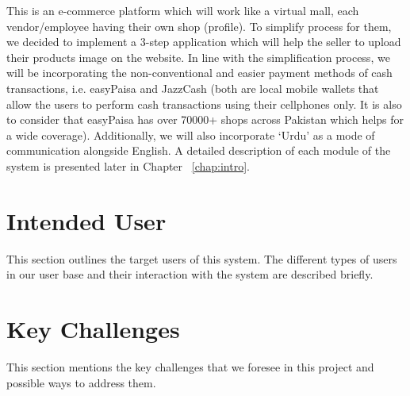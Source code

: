 This is an e-commerce platform which will work like a virtual mall, each vendor/employee having their
own shop (profile). To simplify process for them, we decided to implement a 3-step application which
will help the seller to upload their products image on the website.
In line with the simplification process, we will be incorporating the non-conventional and easier
payment methods of cash transactions, i.e. easyPaisa and JazzCash (both are local mobile wallets that
allow the users to perform cash transactions using their cellphones only. It is also to consider that
easyPaisa has over 70000+ shops across Pakistan which helps for a wide coverage).
Additionally, we will also incorporate ‘Urdu’ as a mode of communication alongside English. 
A detailed description of each module of the system is presented later in Chapter ~\ref{chap:intro}.

\section{Intended User}

This section outlines the target users of this system. The different types of users in our user base and their interaction with the system are described briefly.

\section{Key Challenges}

This section mentions the key challenges that we foresee in this project and possible ways to address them.